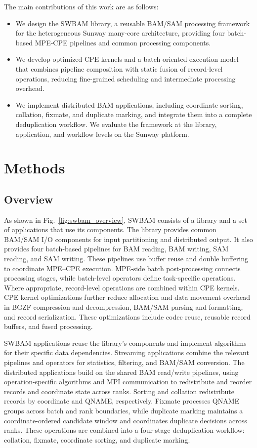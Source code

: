 \documentclass[lettersize,journal]{IEEEtran}
\begin{document}
The main contributions of this work are as follows:
\begin{itemize}
    \item We design the SWBAM library, a reusable BAM/SAM processing framework for the heterogeneous Sunway many-core architecture, providing four batch-based MPE-CPE pipelines and common processing components.
    \item We develop optimized CPE kernels and a batch-oriented execution model that combines pipeline composition with static fusion of record-level operations, reducing fine-grained scheduling and intermediate processing overhead.
    \item We implement distributed BAM applications, including coordinate sorting, collation, fixmate, and duplicate marking, and integrate them into a complete deduplication workflow. We evaluate the framework at the library, application, and workflow levels on the Sunway platform.
\end{itemize}

\section{Methods}
\subsection{Overview}
As shown in Fig.~\ref{fig:swbam_overview}, SWBAM consists of a library and a set of applications that use its components.
The library provides common BAM/SAM I/O components for input partitioning and distributed output.
It also provides four batch-based pipelines for BAM reading, BAM writing, SAM reading, and SAM writing.
These pipelines use buffer reuse and double buffering to coordinate MPE--CPE execution.
MPE-side batch post-processing connects processing stages, while batch-level operators define task-specific operations.
Where appropriate, record-level operations are combined within CPE kernels.
CPE kernel optimizations further reduce allocation and data movement overhead in BGZF compression and decompression, BAM/SAM parsing and formatting, and record serialization.
These optimizations include codec reuse, reusable record buffers, and fused processing.

SWBAM applications reuse the library's components and implement algorithms for their specific data dependencies.
Streaming applications combine the relevant pipelines and operators for statistics, filtering, and BAM/SAM conversion.
The distributed applications build on the shared BAM read/write pipelines, using operation-specific algorithms and MPI communication to redistribute and reorder records and coordinate state across ranks.
Sorting and collation redistribute records by coordinate and QNAME, respectively.
Fixmate processes QNAME groups across batch and rank boundaries, while duplicate marking maintains a coordinate-ordered candidate window and coordinates duplicate decisions across ranks.
These operations are combined into a four-stage deduplication workflow: collation, fixmate, coordinate sorting, and duplicate marking.
\end{document}
